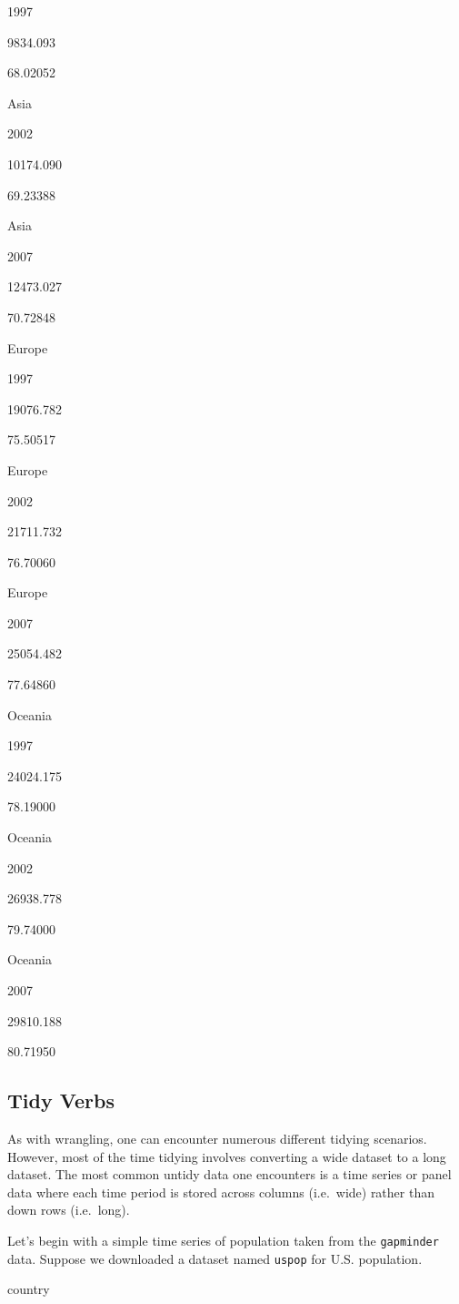 \documentclass[
]{book}
\begin{document}
1997

9834.093

68.02052

Asia

2002

10174.090

69.23388

Asia

2007

12473.027

70.72848

Europe

1997

19076.782

75.50517

Europe

2002

21711.732

76.70060

Europe

2007

25054.482

77.64860

Oceania

1997

24024.175

78.19000

Oceania

2002

26938.778

79.74000

Oceania

2007

29810.188

80.71950

\hypertarget{tidy-verbs}{%
\subsection{Tidy Verbs}\label{tidy-verbs}}

As with wrangling, one can encounter numerous different tidying scenarios. However, most of the time tidying involves converting a wide dataset to a long dataset. The most common untidy data one encounters is a time series or panel data where each time period is stored across columns (i.e.~wide) rather than down rows (i.e.~long).

Let's begin with a simple time series of population taken from the \texttt{gapminder} data. Suppose we downloaded a dataset named \texttt{uspop} for U.S. population.

country
\end{document}

